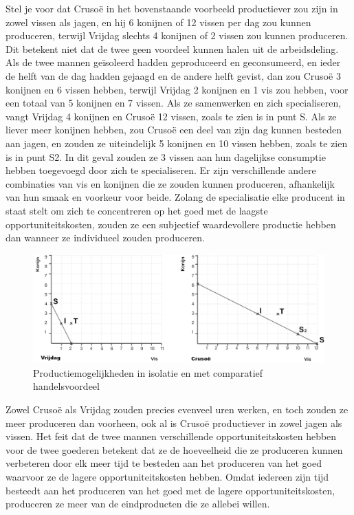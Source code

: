 Stel je voor dat Crusoë in het bovenstaande voorbeeld productiever zou zijn in zowel vissen als jagen, en hij 6 konijnen of 12 vissen per dag zou kunnen produceren, terwijl Vrijdag slechts 4 konijnen of 2 vissen zou kunnen produceren. Dit betekent niet dat de twee geen voordeel kunnen halen uit de arbeidsdeling. Als de twee mannen geïsoleerd hadden geproduceerd en geconsumeerd, en ieder de helft van de dag hadden gejaagd en de andere helft gevist, dan zou Crusoë 3 konijnen en 6 vissen hebben, terwijl Vrijdag 2 konijnen en 1 vis zou hebben, voor een totaal van 5 konijnen en 7 vissen. Als ze samenwerken en zich specialiseren, vangt Vrijdag 4 konijnen en Crusoë 12 vissen, zoals te zien is in punt S. Als ze liever meer konijnen hebben, zou Crusoë een deel van zijn dag kunnen besteden aan jagen, en zouden ze uiteindelijk 5 konijnen en 10 vissen hebben, zoals te zien is in punt S2. In dit geval zouden ze 3 vissen aan hun dagelijkse consumptie hebben toegevoegd door zich te specialiseren. Er zijn verschillende andere combinaties van vis en konijnen die ze zouden kunnen produceren, afhankelijk van hun smaak en voorkeur voor beide. Zolang de specialisatie elke producent in staat stelt om zich te concentreren op het goed met de laagste opportuniteitskosten, zouden ze een subjectief waardevollere productie hebben dan wanneer ze individueel zouden produceren.

\begin{figure}[!htb]
\centering
    \includegraphics[width=\textwidth]{figures/fig18-1.png}
    \caption[Productiemogelijkheden in isolatie en met comparatief handelsvoordeel]{Productiemogelijkheden in isolatie en met comparatief handelsvoordeel}
    \label{fig18}
\end{figure}

Zowel Crusoë als Vrijdag zouden precies evenveel uren werken, en toch zouden ze meer produceren dan voorheen, ook al is Crusoë productiever in zowel jagen als vissen. Het feit dat de twee mannen verschillende opportuniteitskosten hebben voor de twee goederen betekent dat ze de hoeveelheid die ze produceren kunnen verbeteren door elk meer tijd te besteden aan het produceren van het goed waarvoor ze de lagere opportuniteitskosten hebben. Omdat iedereen zijn tijd besteedt aan het produceren van het goed met de lagere opportuniteitskosten, produceren ze meer van de eindproducten die ze allebei willen.


